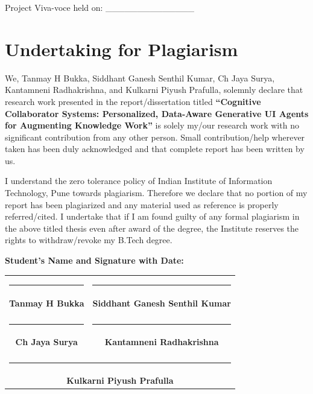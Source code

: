 \documentclass[12pt, a4paper]{report}
\begin{document}
\vspace{1.5cm}

\noindent Project Viva-voce held on: \_\_\_\_\_\_\_\_\_\_\_\_\_\_

\newpage
\chapter*{Undertaking for Plagiarism}

We, Tanmay H Bukka, Siddhant Ganesh Senthil Kumar, Ch Jaya Surya, Kantamneni Radhakrishna, and Kulkarni Piyush Prafulla, solemnly declare that research work presented in the report/dissertation titled \textbf{“Cognitive Collaborator Systems: Personalized, Data-Aware Generative UI Agents for Augmenting Knowledge Work”} is solely my/our research work with no significant contribution from any other person. Small contribution/help wherever taken has been duly acknowledged and that complete report has been written by us. 

I understand the zero tolerance policy of Indian Institute of Information Technology, Pune towards plagiarism. Therefore we declare that no portion of my report has been plagiarized and any material used as reference is properly referred/cited. I undertake that if I am found guilty of any formal plagiarism in the above titled thesis even after award of the degree, the Institute reserves the rights to withdraw/revoke my B.Tech degree.

\vspace{0.8cm}

\noindent \textbf{Student’s Name and Signature with Date:}

\vspace{0.5cm}
\newpage
\begin{table}[H]
    \centering
    \scriptsize
    \begin{tabular}{cc}
    \rule{6cm}{1pt} & \rule{6cm}{1pt} \\
    \textbf{Tanmay H Bukka} & \textbf{Siddhant Ganesh Senthil Kumar} \\
    \vspace{0.8cm} & \vspace{0.8cm} \\
    \rule{6cm}{1pt} & \rule{6cm}{1pt} \\
    \textbf{Ch Jaya Surya} & \textbf{Kantamneni Radhakrishna} \\
    \vspace{0.8cm} & \vspace{0.8cm} \\
    \multicolumn{2}{c}{\rule{6cm}{1pt}} \\
    \multicolumn{2}{c}{\textbf{Kulkarni Piyush Prafulla}} \\
    \end{tabular}
\end{table}
\end{document}
